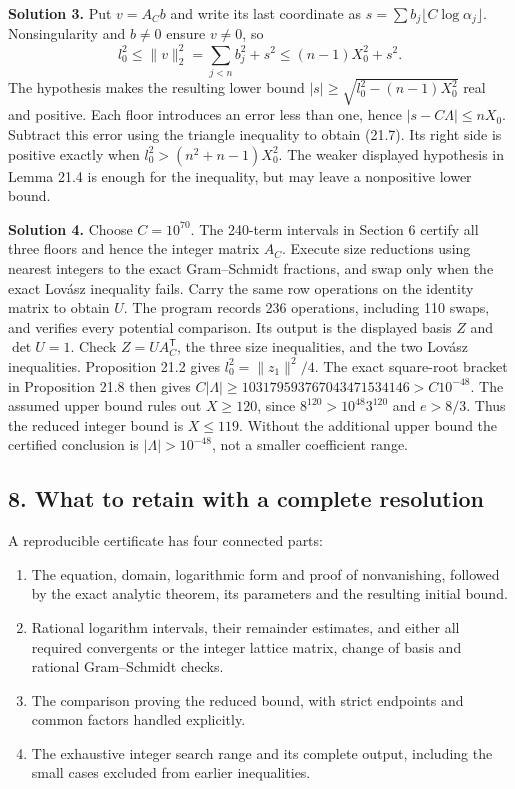 \documentclass[
  11pt,
  a4paper,
]{article}
\providecommand{\tightlist}{%
  \setlength{\itemsep}{0pt}\setlength{\parskip}{0pt}}
\begin{document}
\textbf{Solution 3.} Put \(v=A_Cb\) and write its last coordinate as
\(s=\sum b_j\lfloor C\log\alpha_j\rfloor\). Nonsingularity and \(b\ne0\)
ensure \(v\ne0\), so \[
 l_0^2\le\|v\|_2^2
 =\sum_{j<n}b_j^2+s^2
 \le(n-1)X_0^2+s^2.
\] The hypothesis makes the resulting lower bound
\(|s|\ge\sqrt{l_0^2-(n-1)X_0^2}\) real and positive. Each floor
introduces an error less than one, hence \(|s-C\Lambda|\le nX_0\).
Subtract this error using the triangle inequality to obtain (21.7). Its
right side is positive exactly when \(l_0^2>(n^2+n-1)X_0^2\). The weaker
displayed hypothesis in Lemma 21.4 is enough for the inequality, but may
leave a nonpositive lower bound.

\textbf{Solution 4.} Choose \(C=10^{70}\). The 240-term intervals in
Section 6 certify all three floors and hence the integer matrix \(A_C\).
Execute size reductions using nearest integers to the exact
Gram--Schmidt fractions, and swap only when the exact Lovász inequality
fails. Carry the same row operations on the identity matrix to obtain
\(U\). The program records 236 operations, including 110 swaps, and
verifies every potential comparison. Its output is the displayed basis
\(Z\) and \(\det U=1\). Check \(Z=UA_C^{\mathsf T}\), the three size
inequalities, and the two Lovász inequalities. Proposition 21.2 gives
\(l_0^2=\|z_1\|^2/4\). The exact square-root bracket in Proposition 21.8
then gives \(C|\Lambda|\ge103179593767043471534146>C10^{-48}\). The
assumed upper bound rules out \(X\ge120\), since
\(8^{120}>10^{48}3^{120}\) and \(e>8/3\). Thus the reduced integer bound
is \(X\le119\). Without the additional upper bound the certified
conclusion is \(|\Lambda|>10^{-48}\), not a smaller coefficient range.

\subsection{8. What to retain with a complete
resolution}\label{what-to-retain-with-a-complete-resolution}

A reproducible certificate has four connected parts:

\begin{enumerate}
\def\labelenumi{\arabic{enumi}.}
\tightlist
\item
  The equation, domain, logarithmic form and proof of nonvanishing,
  followed by the exact analytic theorem, its parameters and the
  resulting initial bound.
\item
  Rational logarithm intervals, their remainder estimates, and either
  all required convergents or the integer lattice matrix, change of
  basis and rational Gram--Schmidt checks.
\item
  The comparison proving the reduced bound, with strict endpoints and
  common factors handled explicitly.
\item
  The exhaustive integer search range and its complete output, including
  the small cases excluded from earlier inequalities.
\end{enumerate}
\end{document}
